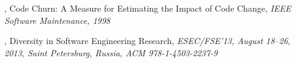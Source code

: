 \begin{thebibliography}{99}
\begin{comment}
		The paper is related to the project in ways of determining future code churn.
		It will be of use to predict software evolution events.
\end{comment}

	 \rm, Code Churn: A
		Measure for Estimating the Impact of Code Change, \emph{IEEE Software
		Maintenance, 1998}\rm

\begin{comment}
		Elbaum and Munson present a methodology that, as they call it, will produce a
		viable fault surrogate. The measure for estimating the impact of code change
		is of interest in this paper. The authors introduced the notion of \emph{code
		churn}. A code churn is the total lines of code added, modified, and removed.
		It is a precise measurement of software development process and product
		outcomes.

		Code churn is an objective measure of software development progress. It
		measures the total work done. Counting the lines of code (LOC) is not enough
		as there could have been a refactoring of existing code that removed 20\% of
		the lines. With counting lines you would miss the work done to remove that
		code. Therefore, code churn is a better way to measure the development
		progress.
\end{comment}

	 \rm,
		Diversity in Software Engineering Research, \emph{ESEC/FSE'13, August 18–26,
		2013, Saint Petersburg, Russia, ACM 978-1-4503-2237-9}\rm

\begin{comment}
		One of the goals of software engineering research is to achieve generality:
		are the phenomena found in a few projects reflective of others? While it is
		common sense to select a sample that is representative of a population, the
		importance of diversity is often overlooked, yet as important. In this paper
		the authors present a measure called \emph{sample coverage}, defined as the
		percentage of projects in a population similar to the given example.
		
		The paper provides insight in why diversity is evenly important as
		representativeness. It provides computation techniques for evaluating a data
		set of software projects. The example computations are based on the Ohloh.net
		universe which is the same as in this Master's project.
\end{comment}


\end{thebibliography}
